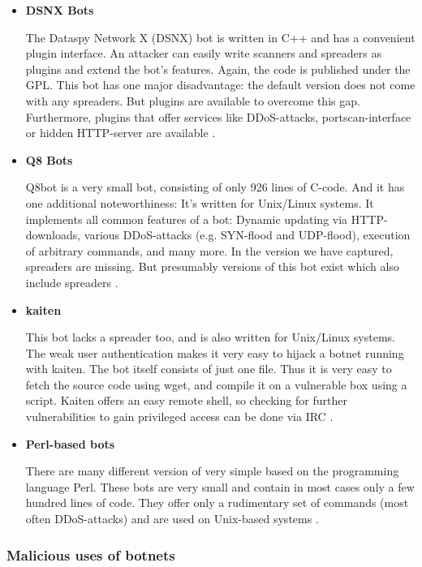 \documentclass[]{article}
\begin{document}
\begin{itemize}
\item\textbf{ DSNX Bots}

The Dataspy Network X (DSNX) bot is written in C++ and has a convenient plugin interface. An attacker can easily write scanners and spreaders as plugins and extend the bot’s features. Again, the code is published under the GPL. This bot has one major disadvantage: the default version does not come with any spreaders. But plugins are available to overcome this gap. Furthermore, plugins that offer services like DDoS-attacks, portscan-interface or hidden HTTP-server are available \cite{article:honeypot-tracking}.

\item \textbf{Q8 Bots}

Q8bot is a very small bot, consisting of only 926 lines of C-code. And it has one additional noteworthiness: It’s written for Unix/Linux systems. It implements all common features of a bot: Dynamic updating via HTTP-downloads, various DDoS-attacks (e.g. SYN-flood and UDP-flood), execution of arbitrary commands, and many more. In the version we have captured, spreaders are missing. But presumably versions of this bot exist which also include spreaders \cite{article:honeypot-tracking}.

\item \textbf{kaiten}

This bot lacks a spreader too, and is also written for Unix/Linux systems. The weak user authentication makes it very easy to hijack a botnet running with kaiten. The bot itself consists of just one file. Thus it is very easy to fetch the source code using wget, and compile it on a vulnerable box using a script. Kaiten offers an easy remote shell, so checking for further vulnerabilities to gain privileged access can be done via IRC \cite{article:honeypot-tracking}.

\item \textbf{Perl-based bots}

There are many different version of very simple based on the programming language Perl. These bots are very small and contain in most cases only a few hundred lines of code. They offer only a rudimentary set of commands (most often DDoS-attacks) and are used on Unix-based systems \cite{article:honeypot-tracking}.

\end{itemize}


\subsubsection{Malicious uses of botnets}
\end{document}
